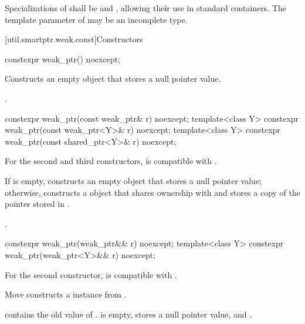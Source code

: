\pnum
Specializations of  shall be  and
, allowing their use in standard
containers.  The template parameter  of  may be an
incomplete type.

[util.smartptr.weak.const]{Constructors}

%
\begin{itemdecl}
constexpr weak_ptr() noexcept;
\end{itemdecl}

\begin{itemdescr}
\pnum
\effects
Constructs an empty  object that stores a null pointer value.

\pnum
\ensures
{}.
\end{itemdescr}

%
\begin{itemdecl}
constexpr weak_ptr(const weak_ptr& r) noexcept;
template<class Y> constexpr weak_ptr(const weak_ptr<Y>& r) noexcept;
template<class Y> constexpr weak_ptr(const shared_ptr<Y>& r) noexcept;
\end{itemdecl}

\begin{itemdescr}
\pnum
\constraints
For the second and third constructors,  is compatible with .

\pnum
\effects
If  is empty, constructs
an empty  object that stores a null pointer value;
otherwise, constructs
a  object that shares ownership
with  and stores a copy of the pointer stored in .

\pnum
\ensures
{}.
\end{itemdescr}

%
\begin{itemdecl}
constexpr weak_ptr(weak_ptr&& r) noexcept;
template<class Y> constexpr weak_ptr(weak_ptr<Y>&& r) noexcept;
\end{itemdecl}

\begin{itemdescr}
\pnum
\constraints
For the second constructor,  is compatible with .

\pnum
\effects
Move constructs a  instance from .

\pnum
\ensures
{} contains the old value of .
 is empty, stores a null pointer value, and .
\end{itemdescr}

